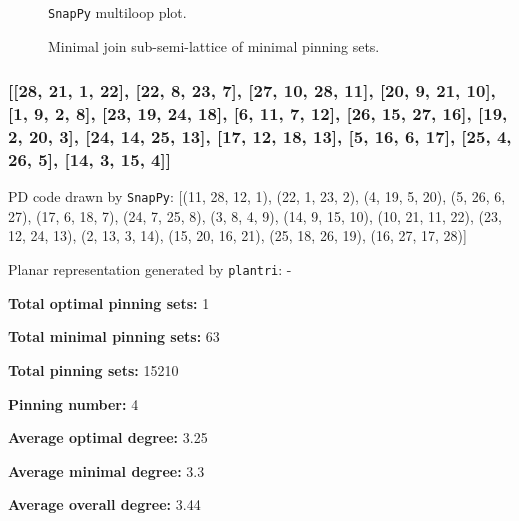 \documentclass{article}%
\begin{document}
\begin{multicols}{2}
\begin{figure}[H]
\centering

\caption{\texttt{SnapPy} multiloop plot.}
\label{fig:tex/img/[[8, 16, 1, 9], [9, 17, 10, 20], [7, 19, 8, 20], [15, 18, 16, 19], [1, 18, 2, 17], [10, 21, 11, 24], [6, 23, 7, 24], [14, 22, 15, 23], [2, 22, 3, 21], [11, 25, 12, 28], [5, 27, 6, 28], [13, 26, 14, 27.svg}
\end{figure}
\columnbreak

\begin{figure}[H]
\centering
\scalebox{0.8}{}
\caption{Minimal join sub-semi-lattice of minimal pinning sets.}
\label{fig:tex/img/[[8, 16, 1, 9], [9, 17, 10, 20], [7, 19, 8, 20], [15, 18, 16, 19], [1, 18, 2, 17], [10, 21, 11, 24], [6, 23, 7, 24], [14, 22, 15, 23], [2, 22, 3, 21], [11, 25, 12, 28], [5, 27, 6, 28], [13, 26, 14, 27.pgf}
\end{figure}
\end{multicols}

\newpage

\subsubsection{[[28, 21, 1, 22], [22, 8, 23, 7], [27, 10, 28, 11], [20, 9, 21, 10], [1, 9, 2, 8], [23, 19, 24, 18], [6, 11, 7, 12], [26, 15, 27, 16], [19, 2, 20, 3], [24, 14, 25, 13], [17, 12, 18, 13], [5, 16, 6, 17], [25, 4, 26, 5], [14, 3, 15, 4]]}

{\small\noindent PD code drawn by \texttt{SnapPy}: [(11, 28, 12, 1), (22, 1, 23, 2), (4, 19, 5, 20), (5, 26, 6, 27), (17, 6, 18, 7), (24, 7, 25, 8), (3, 8, 4, 9), (14, 9, 15, 10), (10, 21, 11, 22), (23, 12, 24, 13), (2, 13, 3, 14), (15, 20, 16, 21), (25, 18, 26, 19), (16, 27, 17, 28)]}

{\small\noindent Planar representation generated by \texttt{plantri}: -}

\begin{multicols}{2}
{\normalsize \noindent\textbf{Total optimal pinning sets:} 1

\noindent\textbf{Total minimal pinning sets:} 63

\noindent\textbf{Total pinning sets:} 15210

\noindent\textbf{Pinning number:} 4

}
\columnbreak

{\normalsize \noindent\textbf{Average optimal degree:} 3.25

\noindent\textbf{Average minimal degree:} 3.3

\noindent\textbf{Average overall degree:} 3.44

}
\end{multicols}
\end{document}
